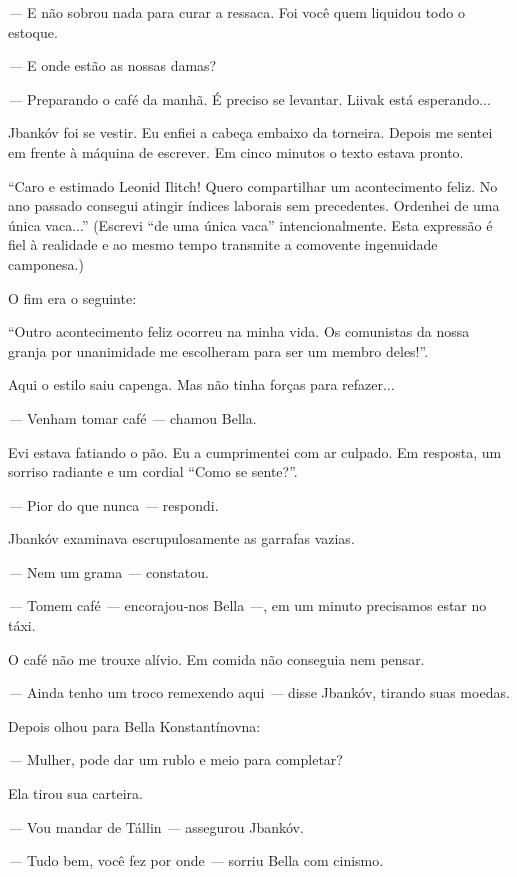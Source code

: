 \emph{---} E não sobrou nada para curar a ressaca. Foi você quem
liquidou todo o estoque.

\emph{---} E onde estão as nossas damas?

\emph{---} Preparando o café da manhã. É preciso se levantar. Liivak
está esperando...

Jbankóv foi se vestir. Eu enfiei a cabeça embaixo da torneira. Depois me
sentei em frente à máquina de escrever. Em cinco minutos o texto estava
pronto.

``Caro e estimado Leonid Ilitch! Quero compartilhar um acontecimento
feliz. No ano passado consegui atingir índices laborais sem precedentes.
Ordenhei de uma única vaca...'' (Escrevi ``de uma única vaca''
intencionalmente. Esta expressão é fiel à realidade e ao mesmo tempo
transmite a comovente ingenuidade camponesa.)

O fim era o seguinte:

``Outro acontecimento feliz ocorreu na minha vida. Os comunistas da
nossa granja por unanimidade me escolheram para ser um membro deles!''.

Aqui o estilo saiu capenga. Mas não tinha forças para refazer...

\emph{---} Venham tomar café \emph{---} chamou Bella.

Evi estava fatiando o pão. Eu a cumprimentei com ar culpado. Em
resposta, um sorriso radiante e um cordial ``Como se sente?''.

\emph{---} Pior do que nunca \emph{---} respondi.

Jbankóv examinava escrupulosamente as garrafas vazias.

\emph{---} Nem um grama \emph{---} constatou.

\emph{---} Tomem café \emph{---} encorajou-nos Bella \emph{---}, em um
minuto precisamos estar no táxi.

O café não me trouxe alívio. Em comida não conseguia nem pensar.

\emph{---} Ainda tenho um troco remexendo aqui \emph{---} disse Jbankóv,
tirando suas moedas.

Depois olhou para Bella Konstantínovna:

\emph{---} Mulher, pode dar um rublo e meio para completar?

Ela tirou sua carteira.

\emph{---} Vou mandar de Tállin \emph{---} assegurou Jbankóv.

\emph{---} Tudo bem, você fez por onde \emph{---} sorriu Bella com
cinismo.


